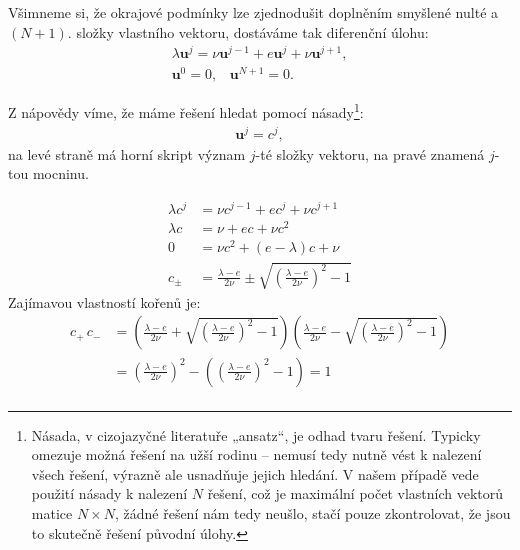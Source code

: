\documentclass[10pt,a4paper]{article}
\begin{document}
Všimneme si, že okrajové podmínky lze zjednodušit doplněním smyšlené nulté a $(N+1)$. složky vlastního vektoru, dostáváme tak diferenční úlohu:
\begin{gather*}
    \lambda \bm{u}^j = \nu \bm{u}^{j-1} + e \bm{u}^j + \nu \bm{u}^{j+1}, \\
    \bm{u}^0 = 0, \;\;\; \bm{u}^{N+1} = 0.
\end{gather*}

Z nápovědy víme, že máme řešení hledat pomocí násady\footnote{Násada, v cizojazyčné literatuře „ansatz“, je odhad tvaru řešení. Typicky omezuje možná řešení na užší rodinu – nemusí tedy nutně vést k nalezení všech řešení, výrazně ale usnadňuje jejich hledání. V našem případě vede použití násady k nalezení $N$ řešení, což je maximální počet vlastních vektorů matice $N\times N$, žádné řešení nám tedy neušlo, stačí pouze zkontrolovat, že jsou to skutečně řešení původní úlohy.}:
\begin{align*}
    \bm{u}^j = c^j,
\end{align*}
na levé straně má horní skript význam $j$-té složky vektoru, na pravé znamená $j$-tou mocninu.

\begin{align*}
    \lambda c^j &= \nu c^{j-1} + e c^j + \nu c^{j+1} \\
    \lambda c &= \nu + e c + \nu c^2 \\
    0 &= \nu c^2 + (e-\lambda) c + \nu \\[10pt]
    c_{\pm} &= \frac{\lambda-e}{2\nu} \pm \sqrt{\left(\frac{\lambda-e}{2\nu}\right)^2 - 1}
\end{align*}
Zajímavou vlastností kořenů je:
\begin{align*}
    c_{+} \, c_{-} &=
    \left(
        \frac{\lambda-e}{2\nu} +
        \sqrt{\left(\frac{\lambda-e}{2\nu}\right)^2 - 1}
    \right)
    \left(
        \frac{\lambda-e}{2\nu} -
        \sqrt{\left(\frac{\lambda-e}{2\nu}\right)^2 - 1}
    \right)
    \\[10pt]
    &=
    \left(\frac{\lambda-e}{2\nu}\right)^2 -
    \left( \left(\frac{\lambda-e}{2\nu}\right)^2 - 1 \right)
    = 1
    \\
\end{align*}
\end{document}
